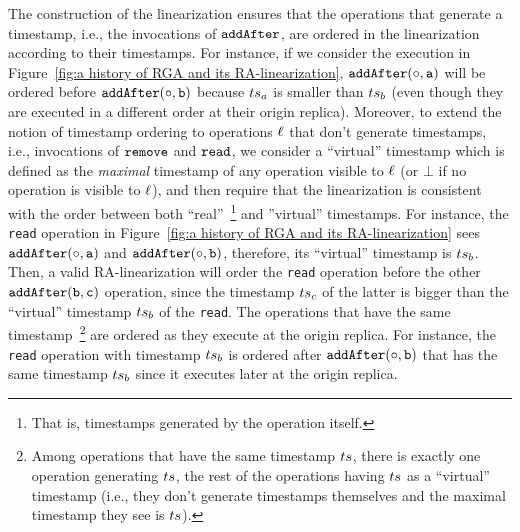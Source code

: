 The construction of the linearization ensures that the operations that generate a timestamp, i.e., the invocations of ${\tt addAfter}$, are ordered in the linearization according to their timestamps. For instance, if we consider the execution in Figure~\ref{fig:a history of RGA and its RA-linearization}, $\alabelshort[{\tt addAfter}]{\circ,a}$ will be ordered before $\alabelshort[{\tt addAfter}]{\circ,b}$ because $ts_a$ is smaller than $ts_b$ (even though they are executed in a different order at their origin replica). 
%
Moreover, to extend the notion of timestamp ordering to operations $\ell$ that don't generate timestamps, i.e., invocations of ${\tt remove}$ and ${\tt read}$, we consider a ``virtual'' timestamp which is defined as the \emph{maximal} timestamp of any operation visible to $\ell$ (or $\bot$ if no operation is visible to $\ell$), and then require that the linearization is consistent with the order between both ``real''~\footnote{That is, timestamps generated by the operation itself.} and ''virtual'' timestamps. For instance, the {\tt read} operation in Figure~\ref{fig:a history of RGA and its RA-linearization} sees $\alabelshort[{\tt addAfter}]{\circ,a}$ and $\alabelshort[{\tt addAfter}]{\circ,b}$, therefore, its ``virtual'' timestamp is $ts_b$. Then, a valid RA-linearization will order the {\tt read} operation before the other $\alabelshort[{\tt addAfter}]{b,c}$ operation, since the timestamp $ts_c$ of the latter is bigger than the ``virtual'' timestamp $ts_b$ of the {\tt read}. The operations that have the same timestamp~\footnote{Among operations that have the same timestamp $ts$, there is exactly one operation generating $ts$, the rest of the operations having $ts$ as a ``virtual'' timestamp (i.e., they don't generate timestamps themselves and the maximal timestamp they see is $ts$).} are ordered as they execute at the origin replica. For instance, the {\tt read} operation with timestamp $ts_b$ is ordered after $\alabelshort[{\tt addAfter}]{\circ,b}$ that has the same timestamp $ts_b$ since it executes later at the origin replica.


